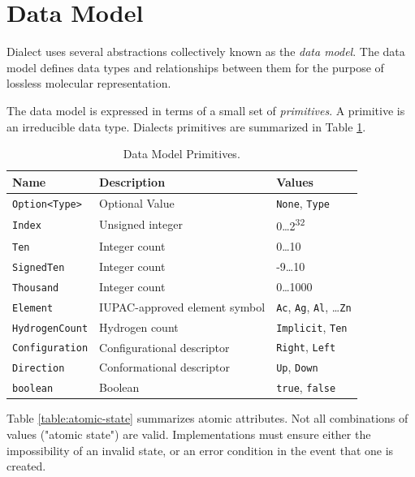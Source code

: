 \documentclass{article}
\def\ttt{\texttt}
\begin{document}
\section*{Data Model}

Dialect uses several abstractions collectively known as the \textit{data model}. The data model defines data types and relationships between them for the purpose of lossless molecular representation.

The data model is expressed in terms of a small set of \textit{primitives}. A primitive is an irreducible data type. Dialects primitives are summarized in Table \ref{table:primitives}.

\begin{table}
\caption{Data Model Primitives.}
\centering
\begin{tabular}{l l l}
    \hline
    Name & Description & Values \\
    \hline
    \ttt{Option<Type>} & Optional Value & \ttt{None}, \ttt{Type} \\
    \ttt{Index} & Unsigned integer & 0{\ldots}2\textsuperscript{32} \\
    \ttt{Ten} & Integer count & 0{\ldots}10 \\
    \ttt{SignedTen} & Integer count & -9{\ldots}10 \\
    \ttt{Thousand} & Integer count & 0{\ldots}1000 \\
    \ttt{Element} & IUPAC-\-approved element symbol & \ttt{Ac}, \ttt{Ag}, \ttt{Al}, {\ldots}\ttt{Zn}\\
    \ttt{HydrogenCount} & Hydrogen count & \ttt{Implicit}, \ttt{Ten} \\
    \ttt{Configuration} & Configurational descriptor & \ttt{Right}, \ttt{Left} \\
    \ttt{Direction} & Conformational descriptor & \ttt{Up}, \ttt{Down} \\
    \ttt{boolean} & Boolean & \ttt{true}, \ttt{false} \\
    \hline
\end{tabular}
\label{table:primitives}
\end{table}

Table \ref{table:atomic-state} summarizes atomic attributes. Not all combinations of values ("atomic state") are valid. Implementations must ensure either the impossibility of an invalid state, or an error condition in the event that one is created.
\end{document}
